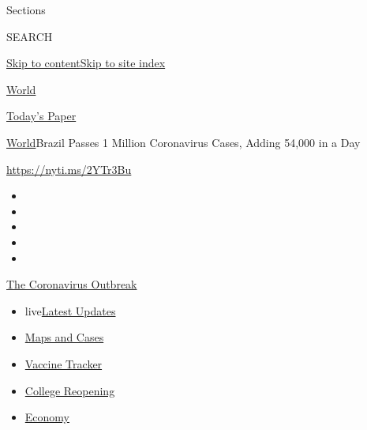 Sections

SEARCH

\protect\hyperlink{site-content}{Skip to
content}\protect\hyperlink{site-index}{Skip to site index}

\href{https://www.nytimes3xbfgragh.onion/section/world}{World}

\href{https://myaccount.nytimes3xbfgragh.onion/auth/login?response_type=cookie\&client_id=vi}{}

\href{https://www.nytimes3xbfgragh.onion/section/todayspaper}{Today's
Paper}

\href{/section/world}{World}\textbar{}Brazil Passes 1 Million
Coronavirus Cases, Adding 54,000 in a Day

\url{https://nyti.ms/2YTr3Bu}

\begin{itemize}
\item
\item
\item
\item
\item
\end{itemize}

\href{https://www.nytimes3xbfgragh.onion/news-event/coronavirus?action=click\&pgtype=Article\&state=default\&region=TOP_BANNER\&context=storylines_menu}{The
Coronavirus Outbreak}

\begin{itemize}
\tightlist
\item
  live\href{https://www.nytimes3xbfgragh.onion/2020/08/04/world/coronavirus-cases.html?action=click\&pgtype=Article\&state=default\&region=TOP_BANNER\&context=storylines_menu}{Latest
  Updates}
\item
  \href{https://www.nytimes3xbfgragh.onion/interactive/2020/us/coronavirus-us-cases.html?action=click\&pgtype=Article\&state=default\&region=TOP_BANNER\&context=storylines_menu}{Maps
  and Cases}
\item
  \href{https://www.nytimes3xbfgragh.onion/interactive/2020/science/coronavirus-vaccine-tracker.html?action=click\&pgtype=Article\&state=default\&region=TOP_BANNER\&context=storylines_menu}{Vaccine
  Tracker}
\item
  \href{https://www.nytimes3xbfgragh.onion/2020/08/02/us/covid-college-reopening.html?action=click\&pgtype=Article\&state=default\&region=TOP_BANNER\&context=storylines_menu}{College
  Reopening}
\item
  \href{https://www.nytimes3xbfgragh.onion/live/2020/08/04/business/stock-market-today-coronavirus?action=click\&pgtype=Article\&state=default\&region=TOP_BANNER\&context=storylines_menu}{Economy}
\end{itemize}

